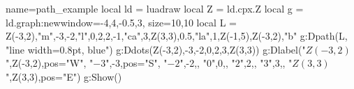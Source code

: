 \begin{luadraw}{name=path_example}
local ld = luadraw
local Z = ld.cpx.Z
local g = ld.graph:new{window={-4,4,-0.5,3}, size={10,10}}
local L = { Z(-3,2),"m",-3,-2,"l",0,2,2,-1,"ca",3,Z(3,3),0.5,"la",1,Z(-1,5),Z(-3,2),"b" }
g:Dpath(L, "line width=0.8pt, blue")
g:Ddots({Z(-3,2),-3,-2,0,2,3,Z(3,3)})
g:Dlabel("$Z(-3,2)$",Z(-3,2),{pos="W"}, "$-3$",-3,{pos="S"}, "$-2$",-2,{},
"$0$",0,{}, "$2$",2,{}, "$3$",3,{}, "$Z(3,3)$",Z(3,3),{pos="E"})
g:Show()
\end{luadraw}
